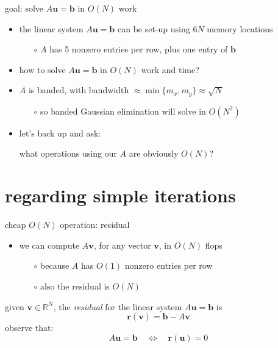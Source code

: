 \documentclass[10pt,
               svgnames,
               hyperref={colorlinks,citecolor=DeepPink4,linkcolor=FireBrick,urlcolor=Maroon},
               usepdftitle=false]{beamer}
\newcommand{\bb}{\mathbf{b}}
\newcommand{\br}{\mathbf{r}}
\newcommand{\bu}{\mathbf{u}}
\newcommand{\bv}{\mathbf{v}}
\newcommand{\RR}{\mathbb{R}}
\begin{document}
\begin{frame}{goal: solve $A\bu=\bb$ in $O(N)$ work}
\begin{itemize}
\item the linear system $A\bu=\bb$ can be set-up using  $6N$ memory locations
	\begin{itemize}
	\item[$\circ$] $A$ has 5 nonzero entries per row, plus one entry of $\bb$
	\end{itemize}
\item how to solve $A\bu=\bb$ in $O(N)$ work and time?

\bigskip
\item<2-> $A$ is banded, with bandwidth $\approx \min\{m_x,m_y\} \approx \sqrt{N}$
	\begin{itemize}
	\item[$\circ$] so banded Gaussian elimination will solve in $O(N^2)$
	\end{itemize}

\bigskip
\item<3> let's back up and ask:

\medskip
\qquad what operations using our $A$ are obviously $O(N)$?
\end{itemize}
\end{frame}


\section{regarding simple iterations}

\begin{frame}{cheap $O(N)$ operation: residual}
\begin{itemize}
\item we can compute $A\bv$, for any vector $\bv$, in $O(N)$ flops
	\begin{itemize}
	\item[$\circ$] because $A$ has $O(1)$ nonzero entries per row
	\item[$\circ$] also the residual is $O(N)$
	\end{itemize}
\end{itemize}

\begin{definition} given $\bv \in\RR^N$, the \emph{residual} for the linear system $A\bu=\bb$ is
	$$\br(\bv) = \bb - A\bv$$
observe that:
    $$A\bu = \bb \quad \iff \quad \br(\bu) = 0$$
\end{definition}
\end{frame}
\end{document}
